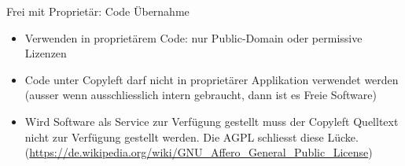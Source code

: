 \begin{frame}{Frei mit Proprietär: Code Übernahme}
\begin{multicols}{2}
{\begin{center}
			\end{center}
		}
	\end{multicols}
\end{frame}
\note
{
	\begin{itemize}
		\item Verwenden in proprietärem Code: nur Public-Domain oder permissive Lizenzen
		\item Code unter Copyleft darf nicht in proprietärer Applikation verwendet werden (ausser wenn ausschliesslich intern gebraucht, dann ist es Freie Software)
		\item Wird Software als Service zur Verfügung gestellt muss der Copyleft Quelltext nicht zur Verfügung gestellt werden. Die AGPL schliesst diese Lücke. (\url{https://de.wikipedia.org/wiki/GNU\_Affero\_General\_Public\_License})
	\end{itemize}
}

